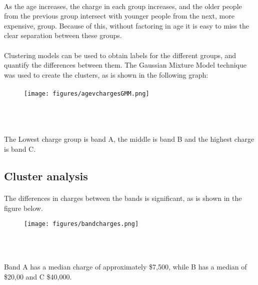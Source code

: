 \documentclass[12pt,twocolumn,letterpaper]{article}
\begin{document}
\paragraph{}
As the age increases, the charge in each group increases, and the older people from the previous group  intersect with younger people from the next, more expensive, group. Because of this, without factoring in age it is easy to miss the clear separation between these groups.

\paragraph{}
Clustering models can be used to obtain labels for the different groups, and quantify the differences between them. The Gaussian Mixture Model technique was used to create the clusters, as is shown in the following graph:
\paragraph{}
\begin{figure}[H]
  \centering
  \texttt{[image: figures/agevchargesGMM.png]}
    \caption{\\\\}
\end{figure} 
\paragraph{}
The Lowest charge group is band A, the middle is band B and the highest charge is band C.


\subsection{Cluster analysis}
\paragraph{}
The differences in charges between the bands is significant, as is shown in the figure below.

\begin{figure}[H]
  \centering
  \texttt{[image: figures/bandcharges.png]}
    \caption{\\\\}
\end{figure} 

Band A has a median charge of approximately \$7,500, while B has a median of \$20,00 and C \$40,000. 
\end{document}

